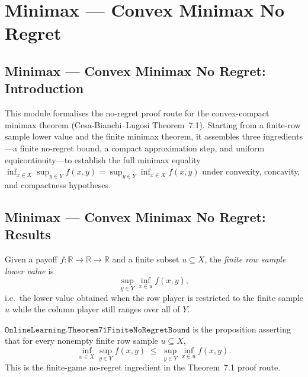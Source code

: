 \section{Minimax --- Convex Minimax No Regret}
\subsection*{Minimax --- Convex Minimax No Regret: Introduction}

This module formalises the no-regret proof route for the convex-compact minimax theorem
(Cesa-Bianchi--Lugosi Theorem~7.1).  Starting from a finite-row sample lower value and
the finite minimax theorem, it assembles three ingredients---a finite no-regret bound, a
compact approximation step, and uniform equicontinuity---to establish the full minimax
equality $\inf_{x \in X} \sup_{y \in Y} f(x,y) = \sup_{y \in Y} \inf_{x \in X} f(x,y)$
under convexity, concavity, and compactness hypotheses.

\subsection*{Minimax --- Convex Minimax No Regret: Results}

\begin{definition}
\label{OnlineLearning.finiteRowSampleLowerValue}
\leanok
Given a payoff $f : \mathbb{R} \to \mathbb{R} \to \mathbb{R}$ and a finite subset
$u \subseteq X$, the \emph{finite row sample lower value} is
\[
  \sup_{y \in Y} \inf_{x \in u} f(x, y),
\]
i.e.\ the lower value obtained when the row player is restricted to the finite sample $u$
while the column player still ranges over all of $Y$.
\end{definition}

\begin{definition}
\label{OnlineLearning.Theorem71FiniteNoRegretBound}
\leanok
{}
$\texttt{OnlineLearning.Theorem71FiniteNoRegretBound}$ is the proposition asserting that
for every nonempty finite row sample $u \subseteq X$,
\[
  \inf_{x \in X} \sup_{y \in Y} f(x,y)
    \;\le\;
  \sup_{y \in Y} \inf_{x \in u} f(x, y).
\]
This is the finite-game no-regret ingredient in the Theorem~7.1 proof route.
\end{definition}

